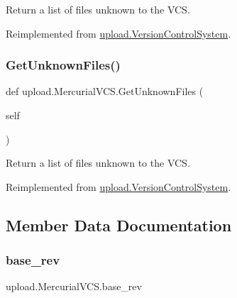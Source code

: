 \begin{DoxyVerb}Return a list of files unknown to the VCS.\end{DoxyVerb}
 

Reimplemented from \mbox{\hyperlink{classupload_1_1VersionControlSystem_a56a60e56aa9aff3df4001d2f84cab884}{upload.\+Version\+Control\+System}}.

\mbox{\label{classupload_1_1MercurialVCS_a6190899fb86cd09ad84cc5d4b0ebd2f3}} 
\subsubsection{\texorpdfstring{GetUnknownFiles()}{GetUnknownFiles()}\hspace{0.1cm}{\footnotesize\ttfamily [2/2]}}
{\footnotesize\ttfamily def upload.\+Mercurial\+V\+C\+S.\+Get\+Unknown\+Files (\begin{DoxyParamCaption}\item[{}]{self }\end{DoxyParamCaption})}

\begin{DoxyVerb}Return a list of files unknown to the VCS.\end{DoxyVerb}
 

Reimplemented from \mbox{\hyperlink{classupload_1_1VersionControlSystem_a56a60e56aa9aff3df4001d2f84cab884}{upload.\+Version\+Control\+System}}.



\subsection{Member Data Documentation}
\mbox{\label{classupload_1_1MercurialVCS_a41faae7820d5a015f4a42476e5e4ab8c}} 
\subsubsection{\texorpdfstring{base\_rev}{base\_rev}}
{\footnotesize\ttfamily upload.\+Mercurial\+V\+C\+S.\+base\+\_\+rev}

\mbox{\label{classupload_1_1MercurialVCS_a219c1e0ab9ce864e3231913762ea489b}} 
